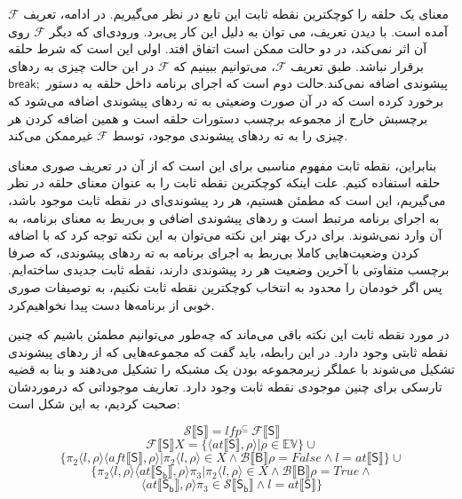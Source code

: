 \begin{defn}
	معنای یک حلقه را کوچکترین نقطه ثابت این تابع در نظر می‌گیریم. در ادامه، تعریف $\mathcal{F} $ آمده است. با دیدن تعریف، می توان به دلیل این کار پی‌برد. ورودی‌ای که دیگر $\mathcal{F} $ روی آن اثر نمی‌کند، در دو حالت ممکن است اتفاق افتد. اولی این است که شرط حلقه برقرار نباشد. طبق تعریف $\mathcal{F} $،  می‌توانیم ببینیم که $\mathcal{F} $  در این حالت چیزی به ردهای پیشوندی اضافه نمی‌کند.حالت دوم است که اجرای برنامه داخل حلقه به دستور $\mathsf{break;}$ برخورد کرده است که در آن صورت وضعیتی به ته ردهای پیشوندی اضافه می‌شود که برچسبش خارج از مجموعه برچسب دستورات حلقه است و همین اضافه کردن هر چیزی را به ته ردهای پیشوندی موجود، توسط $\mathcal{F} $  غیرممکن می‌کند. 
	
	بنابراین، نقطه ثابت مفهوم مناسبی برای این است که از آن در تعریف صوری معنای حلقه استفاده کنیم. علت اینکه کوچکترین نقطه ثابت را به عنوان معنای حلقه در نظر می‌گیریم، این است که مطمئن هستیم، هر رد پیشوندی‌ای در نقطه ثابت موجود باشد، به اجرای برنامه مرتبط است و ردهای پیشوندی اضافی و بی‌ربط به معنای برنامه، به آن وارد نمی‌شوند. برای درک بهتر این نکته می‌توان به این نکته توجه کرد که با اضافه کردن وضعیت‌هایی کاملا بی‌ربط به اجرای برنامه به ته رد‌های پیشوندی، که صرفا برچسب متفاوتی با آخرین وضعیت هر رد پیشوندی دارند، نقطه ثابت جدیدی ساخته‌ایم. پس اگر خودمان را محدود به انتخاب کوچکترین نقطه ثابت نکنیم، به توصیفات صوری خوبی از برنامه‌ها دست پیدا نخواهیم‌کرد. 
	
	در مورد نقطه ثابت این نکته باقی می‌ماند که چه‌طور می‌توانیم مطمئن باشیم که چنین نقطه ثابتی وجود دارد. در این رابطه، باید گفت که مجموعه‌هایی که از ردهای پیشوندی تشکیل می‌شوند با عملگر زیرمجموعه بودن یک مشبکه را تشکیل می‌دهند و بنا به قضیه تارسکی\cite{tarski} برای چنین موجودی نقطه ثابت وجود دارد.
	تعاریف موجوداتی که درموردشان صحبت کردیم، به این شکل است:
	
	$$\mathcal{S} \llbracket\mathsf{S}\rrbracket = lfp^{\subseteq}\: \mathcal{F\llbracket\mathsf{S}\rrbracket}      $$ $$\mathcal{F} \llbracket\mathsf{S}\rrbracket X= \{ \langle at\llbracket\mathsf{S}\rrbracket , \rho \rangle | \rho \in \mathbb{EV}       \} \cup $$
	$$  \{ \pi_2 \langle l ,\rho \rangle \langle aft\llbracket\mathsf{S}\rrbracket,\rho \rangle |  \pi_2 \langle l ,\rho \rangle \in X \wedge \mathcal{B}\llbracket\mathsf{B}\rrbracket\rho=False \wedge l= at\llbracket\mathsf{S}\rrbracket   \} \cup      $$
	$$  \{ \pi_2 \langle l ,\rho \rangle \langle at\llbracket\mathsf{S_b}\rrbracket,\rho \rangle \pi_3 |  \pi_2 \langle l ,\rho \rangle \in X \wedge \mathcal{B}\llbracket\mathsf{B}\rrbracket\rho=True \wedge$$$$  \langle at\llbracket\mathsf{S_b}\rrbracket,\rho \rangle \pi_3 \in  \mathcal{S} \llbracket\mathsf{S_b}\rrbracket   \wedge   l= at\llbracket\mathsf{S}\rrbracket  \}  $$\\
	

\end{defn}
